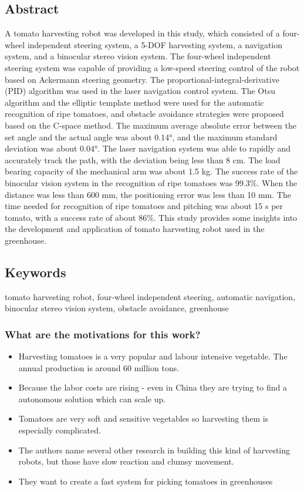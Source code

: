     \subsection*{Abstract}
    A tomato harvesting robot was developed in this study, which consisted of a four-wheel independent steering system,
    a 5-DOF harvesting system, a navigation system, and a binocular stereo vision system.
    The four-wheel independent steering system was capable of providing a low-speed steering control of the robot based on  Ackermann steering geometry.
    The proportional-integral-derivative (PID) algorithm was used in the laser navigation control system. The Otsu algorithm and the
    elliptic template method were used for the automatic recognition of ripe tomatoes, and obstacle avoidance strategies were
    proposed based on the C-space method. The maximum average absolute error between the set angle and the actual angle was
    about 0.14°, and the maximum standard deviation was about 0.04°.  The laser navigation system was able to rapidly and
    accurately track the path, with the deviation being less than 8 cm.  The load bearing capacity of the mechanical arm was about
    1.5 kg. The success rate of the binocular vision system in the recognition of ripe tomatoes was 99.3\%.
    When the distance was less than 600 mm, the positioning error was less than 10 mm.
    The time needed for recognition of ripe tomatoes and pitching was about 15 s per tomato, with a success rate of about 86\%. 
    This study provides some insights into the development and application of tomato harvesting robot used in the greenhouse.
    
    
    \subsection*{Keywords}
    tomato harvesting robot, four-wheel independent steering, automatic navigation, binocular stereo vision system,
    obstacle avoidance, greenhouse
    
     
    
    \subsubsection*{What are the motivations for this work?}
    \begin{itemize}
        \item Harvesting tomatoes is a very popular and labour intensive vegetable. The annual production is around 60 million tons. 
        \item Because the labor costs are rising - even in China they are trying to find a autonomous solution which can scale up.
        \item Tomatoes are very soft and sensitive vegetables so harvesting them is especially complicated.
        \item The authors name several other research in building this kind of harvesting robots, but those have slow reaction and clumsy movement. 
        \item They want to create a fast system for picking tomatoes in greenhouses
    \end{itemize}
